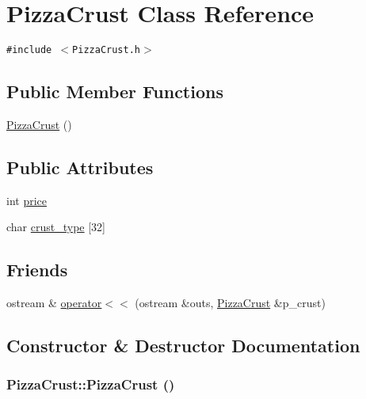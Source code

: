 \hypertarget{class_pizza_crust}{
\section{Pizza\-Crust Class Reference}
\label{class_pizza_crust}
}
{\tt \#include $<$Pizza\-Crust.h$>$}

\subsection*{Public Member Functions}
\begin{CompactItemize}
\item 
\hyperlink{class_pizza_crust_931742b963a7890dfdd6c5b2c92fcbae}{Pizza\-Crust} ()
\end{CompactItemize}
\subsection*{Public Attributes}
\begin{CompactItemize}
\item 
int \hyperlink{class_pizza_crust_78a5eb43deef9a7b5b9ce157b9d52ac4}{price}
\item 
char \hyperlink{class_pizza_crust_91fd485033455873cfc268875c70012f}{crust\_\-type} \mbox{[}32\mbox{]}
\end{CompactItemize}
\subsection*{Friends}
\begin{CompactItemize}
\item 
ostream \& \hyperlink{class_pizza_crust_07175b634a5d3de09efbf91a6a782d36}{operator$<$$<$} (ostream \&outs, \hyperlink{class_pizza_crust}{Pizza\-Crust} \&p\_\-crust)
\end{CompactItemize}


\subsection{Constructor \& Destructor Documentation}
\hypertarget{class_pizza_crust_931742b963a7890dfdd6c5b2c92fcbae}{
\subsubsection[PizzaCrust]{\setlength{\rightskip}{0pt plus 5cm}Pizza\-Crust::Pizza\-Crust ()}}
\label{class_pizza_crust_931742b963a7890dfdd6c5b2c92fcbae}




